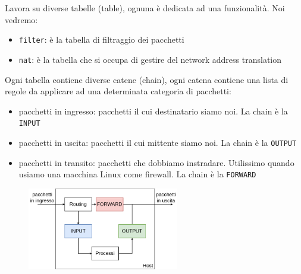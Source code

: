 Lavora su diverse tabelle (table), ognuna è dedicata ad una funzionalità.
Noi vedremo:
\begin{itemize}
    \item \verb{filter{: è la tabella di filtraggio dei pacchetti
    \item \verb{nat{: è la tabella che si occupa di gestire del network address translation
\end{itemize}

Ogni tabella contiene diverse catene (chain), ogni catena contiene una lista di regole da applicare ad una determinata categoria di pacchetti:
\begin{itemize}
    \item pacchetti in ingresso: pacchetti il cui destinatario siamo noi.
    La chain è la \verb{INPUT{

    \item pacchetti in uscita: pacchetti il cui mittente siamo noi.
    La chain è la \verb{OUTPUT{

    \item pacchetti in transito: pacchetti che dobbiamo instradare.
    Utilissimo quando usiamo una macchina Linux come firewall.
    La chain è la \verb{FORWARD{
\end{itemize}

\begin{figure}[H]
    \centering
    \includegraphics[width=250px]{images/4.1_Firewall/filter_chain.png}
\end{figure}

